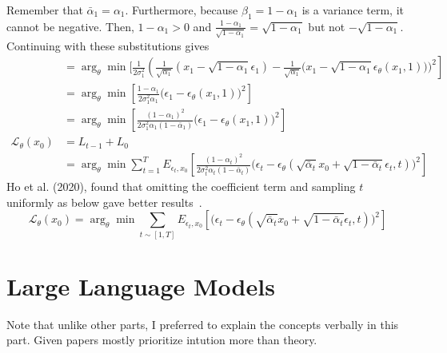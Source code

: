 \documentclass{book}
\numberwithin{equation}{subsection}
\begin{document}
Remember that $\bar{\alpha}_1 = \alpha_1$. Furthermore, because $\beta_1 = 1-\alpha_1$ is a variance term, it cannot be negative. Then, $1-\alpha_1 > 0$ and $\frac{1-\alpha_1}{\sqrt{1-\alpha_1}} = \sqrt{1-\alpha_1}$ but not $-\sqrt{1-\alpha_1}$. Continuing with these substitutions gives
\begin{align}
    &= \arg_\theta\min\Big[{\frac {1}{2\sigma_1^2}}\left(\frac{1}{\sqrt{\alpha_1}}(x_1 - \sqrt{1 - \alpha_1}\epsilon_1)-\frac{1}{\sqrt{\alpha_1}} \big(x_1 - \sqrt{1 - \alpha_1} \epsilon_\theta(x_1,1) \big)\Big)^2\right]\\
    &= \arg_\theta\min\left[\frac{1-\alpha_1}{2\sigma_1^2\alpha_1}\big(\epsilon_1-\epsilon_\theta(x_1,1) \big)^2\right]\\
    &= \arg_\theta\min\left[\frac{(1-\alpha_1)^2}{2\sigma_1^2\alpha_1(1 - \bar{\alpha}_1)}\big(\epsilon_1-\epsilon_\theta(x_1,1) \big)^2\right]\\
    \mathcal{L}_\theta(x_0) &= L_{t-1}+L_0\\
    &= \arg_\theta\min \sum_{t=1}^TE_{\epsilon_t, x_0}\left[\frac{(1-\alpha_t)^2}{2\sigma_t^2\alpha_t(1 - \bar{\alpha}_t)}\Big(\epsilon_t-\epsilon_\theta(\sqrt{\bar{\alpha}_t}x_0 + \sqrt{1 - \bar{\alpha}_t}\epsilon_t,t) \Big)^2\right]
\end{align}
Ho et al. (2020), found that omitting the coefficient term and sampling $t$ uniformly as below gave better results~\cite{ho_denoising_2020}.
\begin{equation}
    \mathcal{L}_\theta(x_0) = \arg_\theta\min \sum_{t \sim [1,T]}E_{\epsilon_t, x_0}\left[\Big(\epsilon_t-\epsilon_\theta(\sqrt{\bar{\alpha}_t}x_0 + \sqrt{1 - \bar{\alpha}_t}\epsilon_t,t) \Big)^2\right]
\end{equation}
\section{Large Language Models}
Note that unlike other parts, I preferred to explain the concepts verbally in this part. Given papers mostly prioritize intution more than theory.
\end{document}
